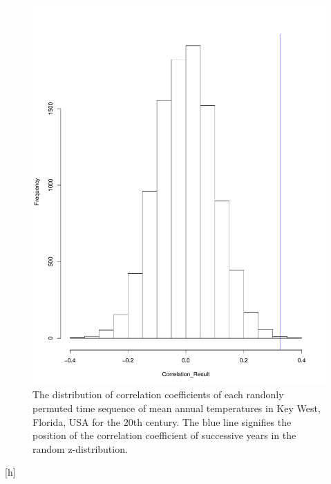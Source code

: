 \documentclass[12pt]{article}
\begin{document}
  \begin{figure}[h]
  \includegraphics[width=\linewidth]{../Data/TAutoCorr_hist.pdf}
  \caption{The distribution of correlation coefficients of each randonly permuted time sequence of mean annual temperatures in Key West, Florida, USA for the 20th century. The blue line signifies the position of the correlation coefficient of successive years in the random z-distribution.}
  \end{figure}[h]
\end{document}
